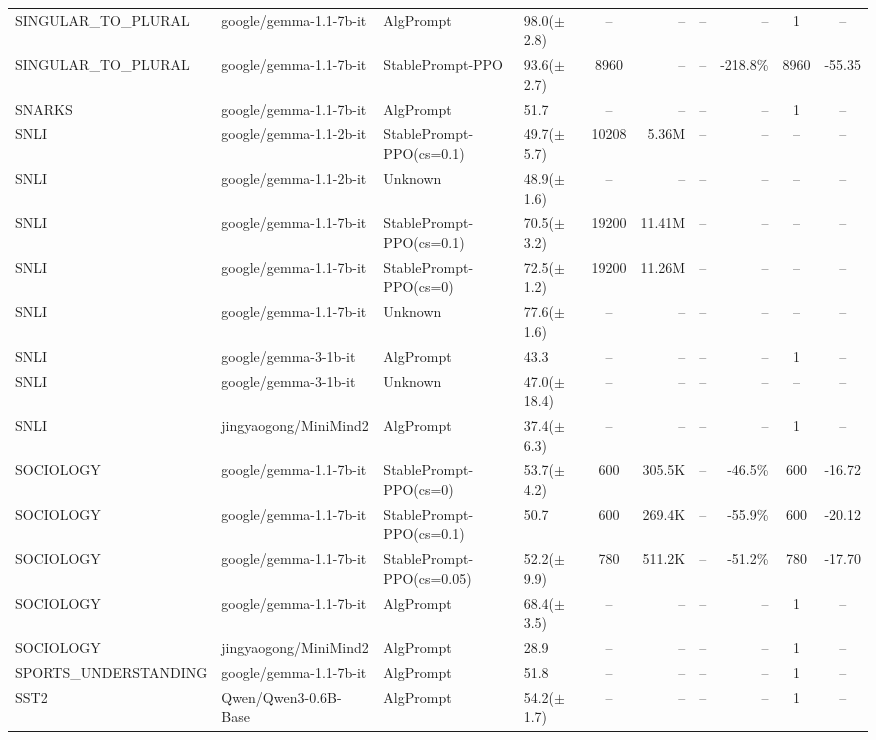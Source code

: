 {\begin{longtable}{@{}p{5.5cm}p{4.5cm}p{2.5cm}lcrrrcc@{}}
\midrule
SINGULAR\_TO\_PLURAL & google/gemma-1.1-7b-it & AlgPrompt & 98.0($\pm$2.8) & -- & -- & -- & -- & 1 & -- \\
SINGULAR\_TO\_PLURAL & google/gemma-1.1-7b-it & StablePrompt-PPO & 93.6($\pm$2.7) & 8960 & -- & -- & -218.8\% & 8960 & -55.35 \\
\midrule
SNARKS & google/gemma-1.1-7b-it & AlgPrompt & 51.7 & -- & -- & -- & -- & 1 & -- \\
\midrule
SNLI & google/gemma-1.1-2b-it & StablePrompt-PPO(cs=0.1) & 49.7($\pm$5.7) & 10208 & 5.36M & -- & -- & -- & -- \\
SNLI & google/gemma-1.1-2b-it & Unknown & 48.9($\pm$1.6) & -- & -- & -- & -- & -- & -- \\
\midrule
SNLI & google/gemma-1.1-7b-it & StablePrompt-PPO(cs=0.1) & 70.5($\pm$3.2) & 19200 & 11.41M & -- & -- & -- & -- \\
SNLI & google/gemma-1.1-7b-it & StablePrompt-PPO(cs=0) & 72.5($\pm$1.2) & 19200 & 11.26M & -- & -- & -- & -- \\
SNLI & google/gemma-1.1-7b-it & Unknown & 77.6($\pm$1.6) & -- & -- & -- & -- & -- & -- \\
\midrule
SNLI & google/gemma-3-1b-it & AlgPrompt & 43.3 & -- & -- & -- & -- & 1 & -- \\
SNLI & google/gemma-3-1b-it & Unknown & 47.0($\pm$18.4) & -- & -- & -- & -- & -- & -- \\
\midrule
SNLI & jingyaogong/MiniMind2 & AlgPrompt & 37.4($\pm$6.3) & -- & -- & -- & -- & 1 & -- \\
\midrule
SOCIOLOGY & google/gemma-1.1-7b-it & StablePrompt-PPO(cs=0) & 53.7($\pm$4.2) & 600 & 305.5K & -- & -46.5\% & 600 & -16.72 \\
SOCIOLOGY & google/gemma-1.1-7b-it & StablePrompt-PPO(cs=0.1) & 50.7 & 600 & 269.4K & -- & -55.9\% & 600 & -20.12 \\
SOCIOLOGY & google/gemma-1.1-7b-it & StablePrompt-PPO(cs=0.05) & 52.2($\pm$9.9) & 780 & 511.2K & -- & -51.2\% & 780 & -17.70 \\
SOCIOLOGY & google/gemma-1.1-7b-it & AlgPrompt & 68.4($\pm$3.5) & -- & -- & -- & -- & 1 & -- \\
\midrule
SOCIOLOGY & jingyaogong/MiniMind2 & AlgPrompt & 28.9 & -- & -- & -- & -- & 1 & -- \\
\midrule
SPORTS\_UNDERSTANDING & google/gemma-1.1-7b-it & AlgPrompt & 51.8 & -- & -- & -- & -- & 1 & -- \\
\midrule
SST2 & Qwen/Qwen3-0.6B-Base & AlgPrompt & 54.2($\pm$1.7) & -- & -- & -- & -- & 1 & -- \\

\end{longtable}}
